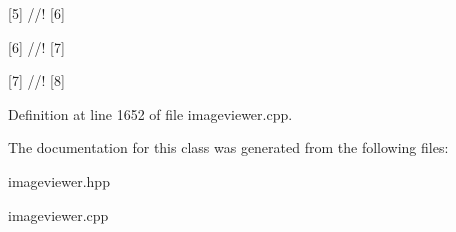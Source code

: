 \mbox{[}5\mbox{]} //! \mbox{[}6\mbox{]} 

\mbox{[}6\mbox{]} //! \mbox{[}7\mbox{]}

\mbox{[}7\mbox{]} //! \mbox{[}8\mbox{]} 

Definition at line 1652 of file imageviewer.\-cpp.



The documentation for this class was generated from the following files\-:\begin{DoxyCompactItemize}
\item 
imageviewer.\-hpp\item 
imageviewer.\-cpp\end{DoxyCompactItemize}
